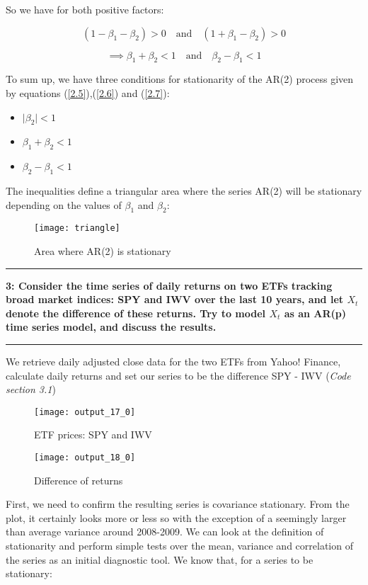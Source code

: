 \documentclass[11pt]{article}
\newcommand\question[2]{\vspace{.25in}\hrule\textbf{#1: #2}\vspace{.5em}\hrule\vspace{.10in}}
\begin{document}
So we have for both positive factors:

$$(1-\beta_1-\beta_2) > 0\quad\text{and}\quad (1+\beta_1-\beta_2) > 0$$

\begin{equation}\label{2.7}
\implies \beta_1+\beta_2 < 1 \quad\text{and}\quad \beta_2 - \beta_1 < 1
\end{equation}

To sum up, we have three conditions for stationarity of the AR(2) process given by equations (\ref{2.5}),(\ref{2.6}) and (\ref{2.7}):
\begin{itemize}
	\item $\lvert \beta_2 \rvert < 1$
	\item $\beta_1 + \beta_2 < 1$
	\item $\beta_2 - \beta_1 < 1$
\end{itemize}

The inequalities define a triangular area where the series AR(2) will be stationary depending on the values of $\beta_1$ and $\beta_2$:
\begin{figure}[H]
	\centering
	\texttt{[image: triangle]}
	\caption{Area where AR(2) is stationary}
	\label{fig:2}
\end{figure}


\question{3}{Consider the time series of daily returns on two ETFs tracking broad market indices: SPY and IWV over the last 10 years, and let $X_t$ denote the difference of these returns. Try to model $X_t$ as an AR(p) time series model, and discuss the results.}

We retrieve daily adjusted close data for the two ETFs from Yahoo! Finance, calculate daily returns and set our series to be the difference SPY - IWV (\textsl{Code section 3.1}) 

\begin{figure}[H]
	\centering
	\texttt{[image: output\_17\_0]}
	\caption{ETF prices: SPY and IWV}
	\label{fig:3}
\end{figure}

\begin{figure}[H]
	\centering
	\texttt{[image: output\_18\_0]}
	\caption{Difference of returns}
	\label{fig:4}
\end{figure}

First, we need to confirm the resulting series is covariance stationary. From the plot, it certainly looks more or less so with the exception of a seemingly larger than average variance around 2008-2009.
We can look at the definition of stationarity and perform simple tests over the mean, variance and correlation of the series as an initial diagnostic tool.
We know that, for a series to be stationary:
\end{document}
